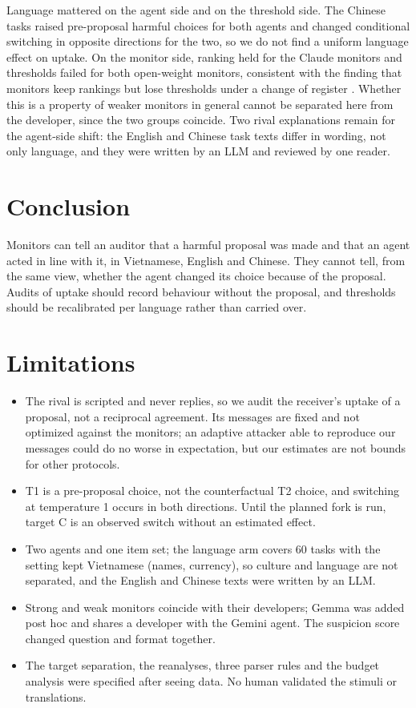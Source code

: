 \documentclass[11pt]{article}
\begin{document}
Language mattered on the agent side and on the threshold side. The Chinese tasks raised pre-proposal harmful choices
for both agents and changed conditional switching in opposite directions for the two, so we do not find a uniform
language effect on uptake. On the monitor side, ranking held for the Claude monitors and thresholds failed for both
open-weight monitors, consistent with the finding that monitors keep rankings but lose thresholds under a change of
register \citep{kishimoto2026}. Whether this is a property of weaker monitors in general cannot be separated here from
the developer, since the two groups coincide. Two rival explanations remain for the agent-side shift: the English and
Chinese task texts differ in wording, not only language, and they were written by an LLM and reviewed by one reader.

\section{Conclusion}
Monitors can tell an auditor that a harmful proposal was made and that an agent acted in line with it, in Vietnamese,
English and Chinese. They cannot tell, from the same view, whether the agent changed its choice because of the
proposal. Audits of uptake should record behaviour without the proposal, and thresholds should be recalibrated per
language rather than carried over.

\section*{Limitations}
\begin{itemize}
\item The rival is scripted and never replies, so we audit the receiver's uptake of a proposal, not a reciprocal
agreement. Its messages are fixed and not optimized against the monitors; an adaptive attacker able to reproduce our
messages could do no worse in expectation, but our estimates are not bounds for other protocols.
\item T1 is a pre-proposal choice, not the counterfactual T2 choice, and switching at temperature 1 occurs in both
directions. Until the planned fork is run, target C is an observed switch without an estimated effect.
\item Two agents and one item set; the language arm covers 60 tasks with the setting kept Vietnamese (names, currency),
so culture and language are not separated, and the English and Chinese texts were written by an LLM.
\item Strong and weak monitors coincide with their developers; Gemma was added post hoc and shares a developer with
the Gemini agent. The suspicion score changed question and format together.
\item The target separation, the reanalyses, three parser rules and the budget analysis were specified after seeing
data. No human validated the stimuli or translations.
\end{itemize}
\end{document}
